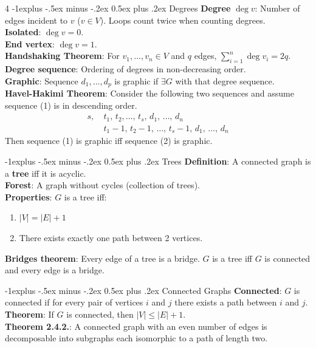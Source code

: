 \documentclass[letterpaper, 8pt]{extarticle}
\makeatletter
\renewcommand{\section}{\@startsection{section}{1}{0mm}%
	{-1explus -.5ex minus -.2ex}%
	{0.5ex plus .2ex}%
	{\normalfont\normalsize\bfseries}}
\makeatother
\begin{document}
\begin{multicols*}{4}
	\section{Degrees}
	\textbf{Degree} $\deg v$: Number of edges incident to $v$ ($v \in V$). Loops count twice when counting degrees. \\
	\textbf{Isolated}: $\deg v = 0$. \\
	\textbf{End vertex}: $\deg v = 1$. \\
	\textbf{Handshaking Theorem}: For $v_1, \dots, v_n \in V$ and $q$ edges, $\sum_{i=1}^n \deg v_i = 2q$. \\
	\textbf{Degree sequence}: Ordering of degrees in non-decreasing order. \\
	\textbf{Graphic}: Sequence $d_1, \dots, d_p$ is graphic if $\exists G$ with that degree sequence. \\
	\textbf{Havel-Hakimi Theorem}: Consider the following two sequences and assume sequence (1) is in descending order.
	\begin{align}
		s,\  & t_1,\, t_2, \ldots,\, t_s,\, d_1,\, \ldots,\, d_n         \\
		     & t_1-1,\, t_2-1,\, \ldots,\, t_s-1,\, d_1,\, \ldots,\, d_n
	\end{align}
	Then sequence (1) is graphic iff sequence (2) is graphic.

	\section{Trees}
	\textbf{Definition}: A connected graph is a \textbf{tree} iff it is acyclic. \\
	\textbf{Forest}: A graph without cycles (collection of trees). \\
	\textbf{Properties}: $G$ is a tree iff:
	\begin{enumerate}
		\item $|V| = |E| + 1$
		\item There exists exactly one path between 2 vertices.
	\end{enumerate}
	\textbf{Bridges theorem}: Every edge of a tree is a bridge. $G$ is a tree iff $G$ is connected and every edge is a bridge.

	\section{Connected Graphs}
	\textbf{Connected}: $G$ is connected if for every pair of vertices $i$ and $j$ there exists a path between $i$ and $j$. \\
	\textbf{Theorem}: If $G$ is connected, then $|V| \le |E| + 1$. \\
	\textbf{Theorem 2.4.2.}: A connected graph with an even number of edges is decomposable into subgraphs each isomorphic to a path of length two.


\end{multicols*}
\end{document}
